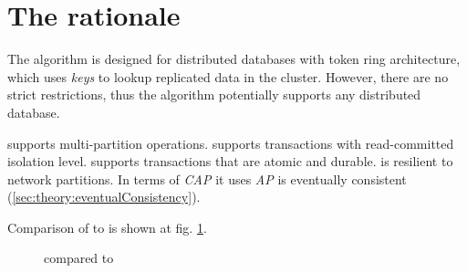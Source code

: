 
\section{The rationale}
The \mpp algorithm is designed for distributed databases with token ring architecture,
which uses \emph{keys} to lookup replicated data in the cluster. However, there are no strict restrictions, thus the algorithm potentially supports any distributed database.

\mpp supports multi-partition operations.
\mpp supports transactions with read-committed isolation level. 
\mpp supports transactions that are atomic and durable.
\mpp is resilient to network partitions. In terms of \emph{CAP} \cite{Brewer:2012ba} it uses \emph{AP}
\mpp is eventually consistent (\ref{sec:theory:eventualConsistency}). 

Comparison of \mpp to \lwt is shown at fig. \ref{fig:mppVsLwt}.

\begin{figure}[hbt]
  \setlength{\unitlength}{1.3cm}  
  \caption{\mpp compared to \lwt}
  \label{fig:mppVsLwt}
\end{figure}





